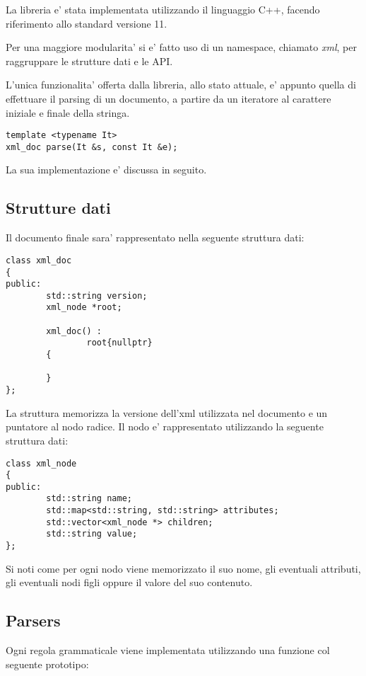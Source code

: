 \documentclass[italian,a4paper]{article}
\begin{document}
La libreria e' stata implementata utilizzando il linguaggio C++, facendo
riferimento allo standard versione 11.

Per una maggiore modularita' si e' fatto uso di un namespace, chiamato
\emph{xml}, per raggruppare le strutture dati e le API.

L'unica funzionalita' offerta dalla libreria, allo stato attuale, e' appunto
quella di effettuare il parsing di un documento, a partire da un iteratore al
carattere iniziale e finale della stringa.

\begin{verbatim}
template <typename It>
xml_doc parse(It &s, const It &e);
\end{verbatim}

La sua implementazione e' discussa in seguito.

\subsection{Strutture dati}

Il documento finale sara' rappresentato nella seguente struttura dati:

\begin{verbatim}
class xml_doc
{
public:
        std::string version;
        xml_node *root;

        xml_doc() :
                root{nullptr}
        {   

        }   
};
\end{verbatim}

La struttura memorizza la versione dell'xml utilizzata nel documento e un
puntatore al nodo radice. Il nodo e' rappresentato utilizzando la seguente
struttura dati:

\begin{verbatim}
class xml_node
{
public:
        std::string name;
        std::map<std::string, std::string> attributes;
        std::vector<xml_node *> children;
        std::string value;
};
\end{verbatim}

Si noti come per ogni nodo viene memorizzato il suo nome, gli eventuali
attributi, gli eventuali nodi figli oppure il valore del suo contenuto.

\subsection{Parsers}

Ogni regola grammaticale viene implementata utilizzando una funzione col
seguente prototipo:
\end{document}
